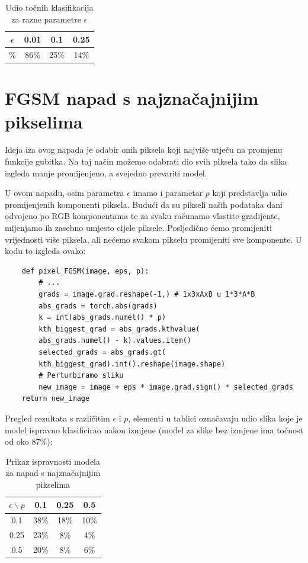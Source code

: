 \begin{table}[H]
	\centering
	\begin{tabular}{||c || c | c | c||} 
		\hline
		$\epsilon$ & 0.01 & 0.1 & 0.25 \\ [0.5ex] 
		\hline\hline
		\% & 86\% & 25\% & 14\% \\ 
		\hline
	\end{tabular}
	\caption{Udio točnih klasifikacija za razne parametre $\epsilon$}
\end{table}


\section{FGSM napad s najznačajnijim pikselima}

Ideja iza ovog napada je odabir onih piksela koji najviše utječu na promjenu funkcije gubitka. Na taj način možemo odabrati dio svih piksela tako da slika izgleda manje promijenjeno, a svejedno prevariti model. 

U ovom napadu, osim parametra $\epsilon$ imamo i parametar $p$ koji predstavlja udio promijenjenih komponenti piksela. Budući da su pikseli naših podataka dani odvojeno po RGB komponentama te za svaku računamo vlastite gradijente, mijenjamo ih zasebno umjesto cijele piksele. Posljedično ćemo promijeniti vrijednosti više piksela, ali nećemo svakom pikselu promijeniti sve komponente. U kodu to izgleda ovako:
\begin{verbatim}
    def pixel_FGSM(image, eps, p):
        # ...
        grads = image.grad.reshape(-1,) # 1x3xAxB u 1*3*A*B
        abs_grads = torch.abs(grads)
        k = int(abs_grads.numel() * p)
        kth_biggest_grad = abs_grads.kthvalue(
        abs_grads.numel() - k).values.item()
        selected_grads = abs_grads.gt(
        kth_biggest_grad).int().reshape(image.shape)
        # Perturbiramo sliku
        new_image = image + eps * image.grad.sign() * selected_grads
    return new_image
\end{verbatim}

Pregled rezultata s različitim $\epsilon$ i $p$, elementi u tablici označavaju udio slika koje je model ispravno klasificirao nakon izmjene (model za slike bez izmjene ima točnost od oko 87\%):

\begin{table}[H]
	\centering
	\begin{tabular}{||c || c c c||} 
		\hline
		$\epsilon \backslash p$ & 0.1 & 0.25 & 0.5 \\ [0.5ex] 
		\hline\hline
		0.1 & 38\% & 18\% & 10\% \\ 
		0.25 & 23\% & 8\% & 4\% \\
		0.5 & 20\% & 8\% & 6\% \\ [1ex] 
		\hline
	\end{tabular}
	\caption{Prikaz ispravnosti modela za napad s najznačajnijim pikselima}
\end{table}

